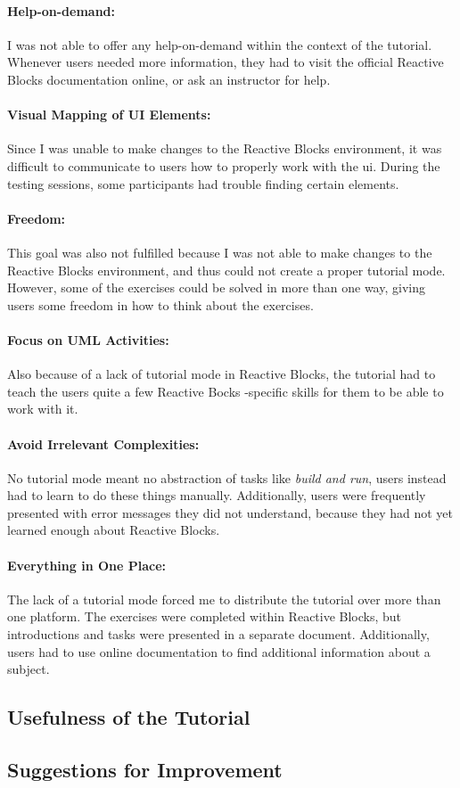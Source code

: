 \paragraph{Help-on-demand:} I was not able to offer any help-on-demand within the context of the tutorial. Whenever users needed more information, they had to visit the official Reactive Blocks documentation online, or ask an instructor for help.

\paragraph{Visual Mapping of UI Elements:} Since I was unable to make changes to the Reactive Blocks environment, it was difficult to communicate to users how to properly work with the \gls{ui}. During the testing sessions, some participants had trouble finding certain elements.

\paragraph{Freedom:} This goal was also not fulfilled because I was not able to make changes to the Reactive Blocks environment, and thus could not create a proper tutorial mode. However, some of the exercises could be solved in more than one way, giving users some freedom in how to think about the exercises.

\paragraph{Focus on UML Activities:} Also because of a lack of tutorial mode in Reactive Blocks, the tutorial had to teach the users quite a few Reactive Bocks -specific skills for them to be able to work with it.

\paragraph{Avoid Irrelevant Complexities:} No tutorial mode meant no abstraction of tasks like \emph{build and run}, users instead had to learn to do these things manually. Additionally, users were frequently presented with error messages they did not understand, because they had not yet learned enough about Reactive Blocks.

\paragraph{Everything in One Place:} The lack of a tutorial mode forced me to distribute the tutorial over more than one platform. The exercises were completed within Reactive Blocks, but introductions and tasks were presented in a separate document. Additionally, users had to use online documentation to find additional information about a subject.

\subsection{Usefulness of the Tutorial}
\label{sec:tutorial_usefulness}


\subsection{Suggestions for Improvement}
\label{sec:tutorial_improvement}


